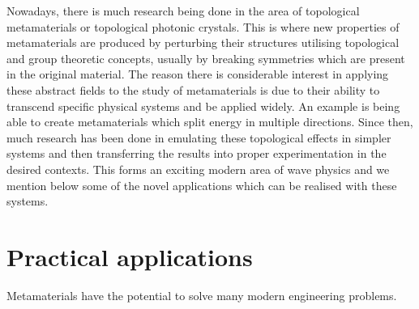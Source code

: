 Nowadays, there is much research being done in the area of topological
metamaterials or topological photonic
crystals.\cite{topoedge,toposplit,topomet} This is where new properties of
metamaterials are produced by perturbing their structures utilising topological
and group theoretic concepts, usually by breaking symmetries which are present
in the original material. The reason there is considerable interest in applying
these abstract fields to the study of metamaterials is due to their ability to
transcend specific physical systems and be applied widely. An example is being
able to create metamaterials which split energy in multiple
directions.\cite{toposplit} Since then, much research has been done in
emulating these topological effects in simpler systems and then transferring
the results into proper experimentation in the desired
contexts.\cite{elasticvhe,singlevalley,exobs,exobs2} This forms an exciting
modern area of wave physics and we mention below some of the novel applications
which can be realised with these systems.

\section{Practical applications}
\label{applications}
Metamaterials have the potential to solve many modern engineering problems.


